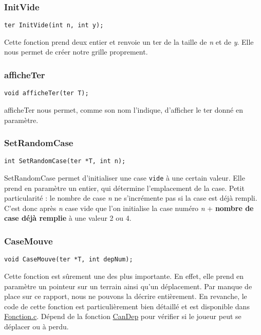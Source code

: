 \documentclass[letter]{article}
\begin{document}
\subsubsection{InitVide}
\label{sec:org9eeaa9b}

\begin{verbatim}
ter InitVide(int n, int y);
\end{verbatim}

Cette fonction prend deux entier et renvoie un ter de la taille de \emph{n} et de \emph{y}.
Elle nous permet de créer notre grille proprement.

\subsubsection{afficheTer}
\label{sec:org77b2d18}

\begin{verbatim}
void afficheTer(ter T);
\end{verbatim}

afficheTer nous permet, comme son nom l'indique, d'afficher le ter donné en paramètre.

\subsubsection{SetRandomCase}
\label{sec:org760c4c9}

\begin{verbatim}
int SetRandomCase(ter *T, int n);
\end{verbatim}

SetRandomCase permet d'initialiser une case \texttt{vide} à une certain valeur. Elle prend en paramètre un entier, qui détermine l'emplacement de la case. Petit particularité : le nombre de case \emph{n} ne s'incrémente pas si la case est déjà rempli. C'est donc après \emph{n} case vide que l'on initialise la case numéro \emph{n} + \textbf{nombre de case déjà remplie} à une valeur 2 ou 4.

\subsubsection{CaseMouve}
\label{sec:orgf9c39a8}

\begin{verbatim}
void CaseMouve(ter *T, int depNum);
\end{verbatim}

Cette fonction est sûrement une des plus importante. En effet, elle prend en paramètre un pointeur sur un terrain ainsi qu'un déplacement. 
Par manque de place sur ce rapport, nous ne pouvons la décrire entièrement. En revanche, le code de cette fonction est particulièrement bien détaillé et est disponible dans \href{FonctionJeu.c}{Fonction.c}.
Dépend de la fonction \hyperref[sec:org42dfd89]{CanDep} pour vérifier si le joueur peut se déplacer ou à perdu.
\end{document}
